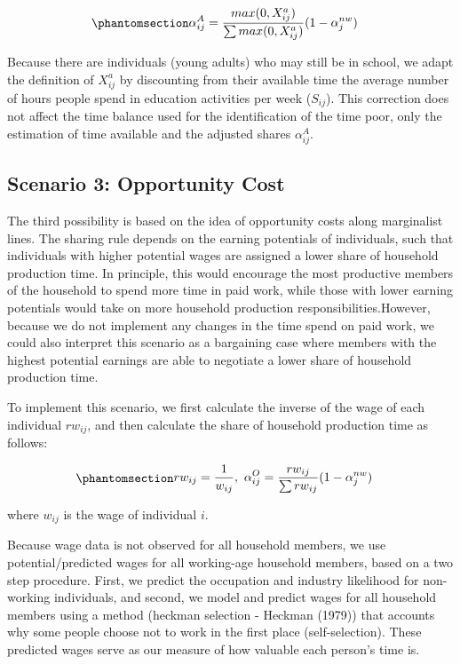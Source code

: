 \documentclass[
  11pt,
]{article}
\begin{document}
\begin{equation}\phantomsection\label{eq-r2}{
\begin{aligned}
\alpha_{ij}^A &= \frac{max(0,X^a_{ij})}{\sum max(0,X^a_{ij})} (1-\alpha_{j}^{nw})
\end{aligned}
}\end{equation}

Because there are individuals (young adults) who may still be in school,
we adapt the definition of \(X^a_{ij}\) by discounting from their
available time the average number of hours people spend in education
activities per week (\(S_{ij}\)). This correction does not affect the
time balance used for the identification of the time poor, only the
estimation of time available and the adjusted shares \(\alpha_{ij}^A\).

\subsection{Scenario 3: Opportunity
Cost}\label{scenario-3-opportunity-cost}

The third possibility is based on the idea of opportunity costs along
marginalist lines. The sharing rule depends on the earning potentials of
individuals, such that individuals with higher potential wages are
assigned a lower share of household production time. In principle, this
would encourage the most productive members of the household to spend
more time in paid work, while those with lower earning potentials would
take on more household production responsibilities.However, because we
do not implement any changes in the time spend on paid work, we could
also interpret this scenario as a bargaining case where members with the
highest potential earnings are able to negotiate a lower share of
household production time.

To implement this scenario, we first calculate the inverse of the wage
of each individual \(rw_{ij}\), and then calculate the share of
household production time as follows:

\begin{equation}\phantomsection\label{eq-r3}{\begin{aligned}
rw_{ij} &= \frac{1}{w_{ij}}, \ \alpha_{ij}^O  = \frac{rw_{ij}}{\sum rw_{ij}} (1-\alpha_{j}^{nw})
\end{aligned}
}\end{equation}

where \(w_{ij}\) is the wage of individual \(i\).

Because wage data is not observed for all household members, we use
potential/predicted wages for all working-age household members, based
on a two step procedure. First, we predict the occupation and industry
likelihood for non-working individuals, and second, we model and predict
wages for all household members using a method (heckman selection -
Heckman (1979)) that accounts why some people choose not to work in the
first place (self-selection). These predicted wages serve as our measure
of how valuable each person's time is.
\end{document}
